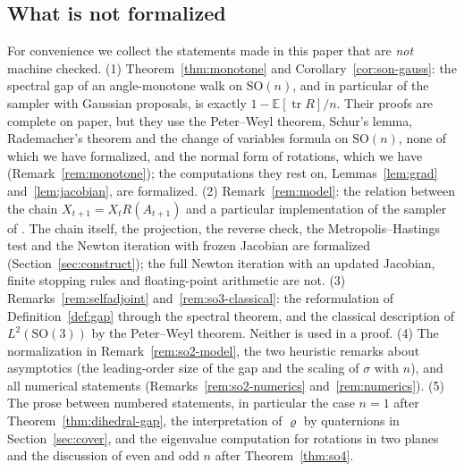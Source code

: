 \documentclass[11pt]{amsart}
\theoremstyle{definition}
\theoremstyle{remark}
\newcommand{\E}{\mathbb{E}}
\newcommand{\SO}{\mathrm{SO}}
\newcommand{\tr}{\operatorname{tr}}
\begin{document}
\subsection*{What is not formalized}
For convenience we collect the statements made in this paper that are \emph{not} machine
checked.
(1) Theorem~\ref{thm:monotone} and Corollary~\ref{cor:son-gauss}: the spectral gap of an
angle-monotone walk on $\SO(n)$, and in particular of the sampler with Gaussian proposals, is
exactly $1-\E[\tr R]/n$.  Their proofs are complete on paper, but they use the Peter--Weyl theorem,
Schur's lemma, Rademacher's theorem and the change of variables formula on $\SO(n)$, none of
which we have formalized, and the normal form of rotations, which we have
(Remark~\ref{rem:monotone}); the
computations they rest on, Lemmas~\ref{lem:grad} and~\ref{lem:jacobian}, are formalized.
(2) Remark~\ref{rem:model}: the relation between the chain $X_{t+1}=X_tR(A_{t+1})$ and a
particular implementation of the sampler of \cite{ZHG}.  The chain itself, the projection, the
reverse check, the Metropolis--Hastings test and the Newton iteration with frozen Jacobian are
formalized (Section~\ref{sec:construct}); the full Newton iteration with an updated Jacobian,
finite stopping rules and floating-point arithmetic are not.
(3) Remarks~\ref{rem:selfadjoint} and~\ref{rem:so3-classical}: the reformulation of
Definition~\ref{def:gap} through the spectral theorem, and the classical description of
$L^2(\SO(3))$ by the Peter--Weyl theorem.  Neither is used in a proof.
(4) The normalization in Remark~\ref{rem:so2-model}, the two heuristic remarks about
asymptotics (the leading-order size of the gap and the scaling of $\sigma$ with $n$), and all
numerical statements (Remarks~\ref{rem:so2-numerics} and~\ref{rem:numerics}).
(5) The prose between numbered statements, in particular the case $n=1$ after
Theorem~\ref{thm:dihedral-gap}, the interpretation of $\varrho$ by quaternions in
Section~\ref{sec:cover}, and the eigenvalue computation for rotations in two planes and the
discussion of even and odd $n$ after Theorem~\ref{thm:so4}.
\end{document}
